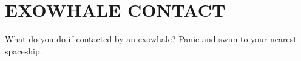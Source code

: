 \label{whaleappendab}
\section{\MakeUppercase{Exowhale Contact}}

What do you do if contacted by an exowhale? Panic and swim to your nearest spaceship.